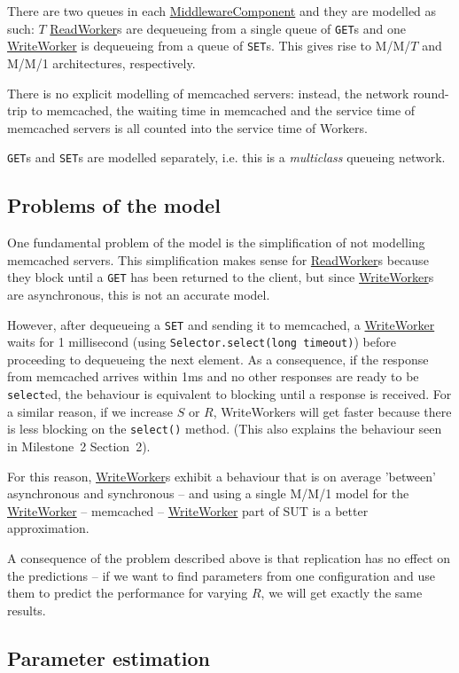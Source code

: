 \documentclass[11pt]{article}
\newcommand{\get}[0]{\texttt{GET}}
\newcommand{\set}[0]{\texttt{SET}}
\newcommand{\linkmain}[1]{\href{https://gitlab.inf.ethz.ch/pungast/asl-fall16-project/blob/master/src/main/java/asl/#1.java}{#1}}
\begin{document}
There are two queues in each \linkmain{MiddlewareComponent} and they are modelled as such: $T$ \linkmain{ReadWorker}s are dequeueing from a single queue of \get{}s and one \linkmain{WriteWorker} is dequeueing from a queue of \set{}s. This gives rise to M/M/$T$ and M/M/1 architectures, respectively.

There is no explicit modelling of memcached servers: instead, the network round-trip to memcached, the waiting time in memcached and the service time of memcached servers is all counted into the service time of Workers.

\get{}s and \set{}s are modelled separately, i.e. this is a \emph{multiclass} queueing network.

\subsection{Problems of the model}
\label{sec:part3:problems}

One fundamental problem of the model is the simplification of not modelling memcached servers. This simplification makes sense for \linkmain{ReadWorker}s because they block until a \get{} has been returned to the client, but since \linkmain{WriteWorker}s are asynchronous, this is not an accurate model.

However, after dequeueing a \set{} and sending it to memcached, a \linkmain{WriteWorker} waits for 1 millisecond (using \texttt{Selector.select(long timeout)}) before proceeding to dequeueing the next element. As a consequence, if the response from memcached arrives within 1ms and no other responses are ready to be \texttt{select}ed, the behaviour is equivalent to blocking until a response is received. For a similar reason, if we increase $S$ or $R$, WriteWorkers will get faster because there is less blocking on the \texttt{select()} method. (This also explains the behaviour seen in Milestone~2 Section~2).

For this reason, \linkmain{WriteWorker}s exhibit a behaviour that is on average 'between' asynchronous and synchronous -- and using a single M/M/1 model for the \linkmain{WriteWorker} -- memcached -- \linkmain{WriteWorker} part of SUT is a better approximation.

A consequence of the problem described above is that replication has no effect on the predictions -- if we want to find parameters from one configuration and use them to predict the performance for varying $R$, we will get exactly the same results.


\subsection{Parameter estimation}
\end{document}
